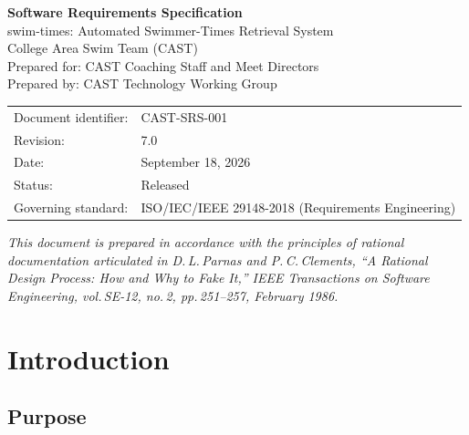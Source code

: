 \documentclass[12pt]{article}
\begin{document}
\begin{titlepage}
  \centering
  \vspace*{2cm}
  {\Huge\bfseries\color{castblue} Software Requirements Specification\\[0.5em]}
  {\Large swim-times: Automated Swimmer-Times Retrieval System}\\[2em]
  {\large College Area Swim Team (CAST)}\\[0.5em]
  {\normalsize Prepared for: CAST Coaching Staff and Meet Directors}\\[0.5em]
  {\normalsize Prepared by: CAST Technology Working Group}\\[2em]
  \begin{tabular}{ll}
    Document identifier: & CAST-SRS-001                                     \\
    Revision:            & 7.0                                              \\
    Date:                & September 18, 2026                              \\
    Status:              & Released                                         \\
    Governing standard:  & ISO/IEC/IEEE 29148-2018 (Requirements Engineering) \\
  \end{tabular}
  \vfill
  {\small\textit{This document is prepared in accordance with the principles
  of rational documentation articulated in D.\,L.\,Parnas and P.\,C.\,Clements,
  ``A Rational Design Process: How and Why to Fake It,''
  \textit{IEEE Transactions on Software Engineering}, vol.\,SE-12, no.\,2,
  pp.\,251--257, February 1986.}}
\end{titlepage}

\tableofcontents
\clearpage

\section{Introduction}

\subsection{Purpose}
\end{document}
